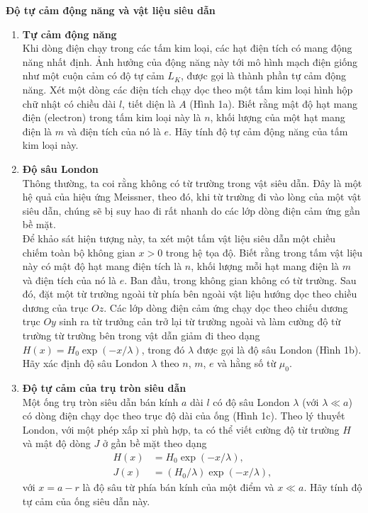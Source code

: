\textbf{Độ tự cảm động năng và vật liệu siêu dẫn}
\begin{enumerate}
    \item \textbf{Tự cảm động năng} \\
    Khi dòng điện chạy trong các tấm kim loại, các hạt điện tích có mang động năng nhất định. Ảnh hưởng của động năng này tới mô hình mạch điện giống như một cuộn cảm có độ tự cảm $L_K$, được gọi là thành phần tự cảm động năng. Xét một dòng các điện tích chạy dọc theo một tấm kim loại hình hộp chữ nhật có chiều dài $l$, tiết diện là $A$ (Hình 1a). Biết rằng mật độ hạt mang điện (electron) trong tấm kim loại này là $n$, khối lượng của một hạt mang điện là $m$ và điện tích của nó là $e$. Hãy tính độ tự cảm động năng của tấm kim loại này.
    \item \textbf{Độ sâu London} \\
    Thông thường, ta coi rằng không có từ trường trong vật siêu dẫn. Đây là một hệ quả của hiệu ứng Meissner, theo đó, khi từ trường đi vào lòng của một vật siêu dẫn, chúng sẽ bị suy hao đi rất nhanh do các lớp dòng điện cảm ứng gần bề mặt. \\
    Để khảo sát hiện tượng này, ta xét một tấm vật liệu siêu dẫn một chiều chiếm toàn bộ không gian $x>0$ trong hệ tọa độ. Biết rằng trong tấm vật liệu này có mật độ hạt mang điện tích là $n$, khối lượng mỗi hạt mang điện là $m$ và điện tích của nó là $e$. Ban đầu, trong không gian không có từ trường. Sau đó, đặt một từ trường ngoài từ phía bên ngoài vật liệu hướng dọc theo chiều dương của trục $Oz$. Các lớp dòng điện cảm ứng chạy dọc theo chiếu dương trục $Oy$ sinh ra từ trưởng cản trở lại từ trường ngoài và làm cường độ từ trường từ trường bên trong vật dẫn giảm đi theo dạng $H(x)=H_0 \exp (-x/\lambda)$, trong đó $\lambda$ được gọi là độ sâu London (Hình 1b). Hãy xác định độ sâu London $\lambda$ theo $n$, $m$, $e$ và hằng số từ $\mu_0$.
    \item \textbf{Độ tự cảm của trụ tròn siêu dẫn} \\
    Một ống trụ tròn siêu dẫn bán kính $a$ dài $l$ có độ sâu London $\lambda$ (với $\lambda \ll a$) có dòng điện chạy dọc theo trục độ dài của ống (Hình 1c). Theo lý thuyết London, với một phép xấp xỉ phù hợp, ta có thể viết cường độ từ trường $H$ và mật độ dòng $J$ ở gần bề mặt theo dạng
    \begin{align*}
        H(x) &= H_0 \exp (-x/\lambda), \\
        J(x) &= (H_0/\lambda) \exp (-x/\lambda),
    \end{align*}
    với $x=a-r$ là độ sâu từ phía bán kính của một điểm và $x \ll a$. Hãy tính độ tự cảm của ống siêu dẫn này.
\end{enumerate}

